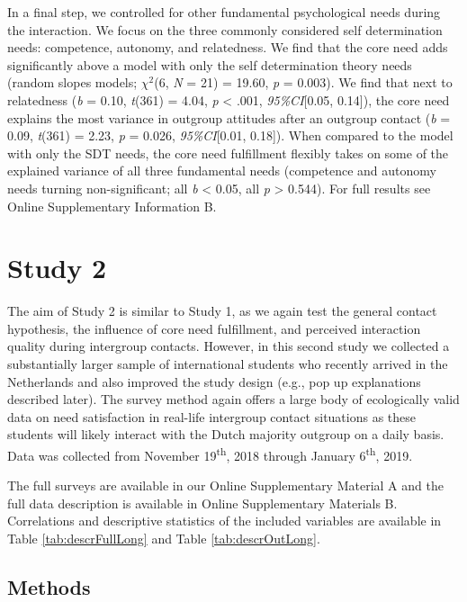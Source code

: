 \documentclass[man, 12pt, a4paper]{apa7}
\theoremstyle{break}
\theoremstyle{plain}
\begin{document}
In a final step, we controlled for other fundamental psychological needs
during the interaction. We focus on the three commonly considered self
determination needs: competence, autonomy, and relatedness. We find that
the core need adds significantly above a model with only the self
determination theory needs (random slopes models; \(\chi^2\)(6,
\textit{N} = 21) = 19.60, \textit{p} = 0.003). We find that next to
relatedness (\textit{b} = 0.10, \textit{t}(361) = 4.04, \textit{p}
\textless{} .001, \textit{95\%CI}{[}0.05, 0.14{]}), the core need
explains the most variance in outgroup attitudes after an outgroup
contact (\textit{b} = 0.09, \textit{t}(361) = 2.23, \textit{p} = 0.026,
\textit{95\%CI}{[}0.01, 0.18{]}). When compared to the model with only
the SDT needs, the core need fulfillment flexibly takes on some of the
explained variance of all three fundamental needs (competence and
autonomy needs turning non-significant; all \textit{b} \textless{} 0.05,
all \textit{p} \textgreater{} 0.544). For full results see Online
Supplementary Information B.

\section{Study 2}

The aim of Study 2 is similar to Study 1, as we again test the general
contact hypothesis, the influence of core need fulfillment, and
perceived interaction quality during intergroup contacts. However, in
this second study we collected a substantially larger sample of
international students who recently arrived in the Netherlands and also
improved the study design (e.g., pop up explanations described later).
The survey method again offers a large body of ecologically valid data
on need satisfaction in real-life intergroup contact situations as these
students will likely interact with the Dutch majority outgroup on a
daily basis. Data was collected from November 19\textsuperscript{th},
2018 through January 6\textsuperscript{th}, 2019.

The full surveys are available in our Online Supplementary Material A
and the full data description is available in Online Supplementary
Materials B. Correlations and descriptive statistics of the included
variables are available in Table \ref{tab:descrFullLong} and Table
\ref{tab:descrOutLong}.

\subsection{Methods}
\end{document}
